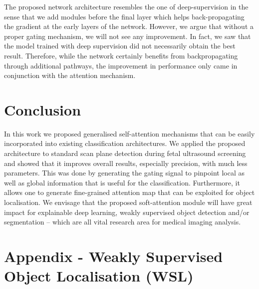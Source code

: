 \documentclass{article}
\begin{document}
The proposed network architecture resembles the one of deep-supervision in the sense that we add modules before the final layer which helps back-propagating the gradient at the early layers of the network. However, we argue that without a proper gating mechanism, we will not see any improvement. In fact, we saw that the model trained with deep supervision did not necessarily obtain the best result. Therefore, while the network certainly benefits from backpropagating through additional pathways, the improvement in performance only came in conjunction with the attention mechanism.

\section{Conclusion}

In this work we proposed generalised self-attention mechanisms that can be easily incorporated into existing classification architectures. We applied the proposed architecture to standard scan plane detection during fetal ultrasound screening and showed that it improves overall results, especially precision, with much less parameters. This was done by generating the gating signal to pinpoint local as well as global information that is useful for the classification. Furthermore, it allows one to generate fine-grained attention map that can be exploited for object localisation. We envisage that the proposed soft-attention module will have great impact for explainable deep learning, weakly supervised object detection and/or segmentation -- which are all vital research area for medical imaging analysis.




\newpage

\section{Appendix - Weakly Supervised Object Localisation (WSL)}
\end{document}
